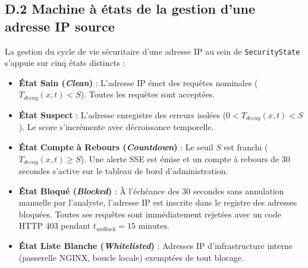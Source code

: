 \subsection*{D.2 Machine à états de la gestion d'une adresse IP source}
La gestion du cycle de vie sécuritaire d'une adresse IP au sein de \texttt{SecurityState} s'appuie sur cinq états distincts :
\begin{itemize}[leftmargin=*]
    \item \textbf{État Sain (\textit{Clean})} : L'adresse IP émet des requêtes nominales ($T_{decay}(x, t) < S$). Toutes les requêtes sont acceptées.
    \item \textbf{État Suspect} : L'adresse enregistre des erreurs isolées ($0 < T_{decay}(x, t) < S$). Le score s'incrémente avec décroissance temporelle.
    \item \textbf{État Compte à Rebours (\textit{Countdown})} : Le seuil $S$ est franchi ($T_{decay}(x, t) \ge S$). Une alerte SSE est émise et un compte à rebours de 30 secondes s'active sur le tableau de bord d'administration.
    \item \textbf{État Bloqué (\textit{Blocked})} : À l'échéance des 30 secondes sans annulation manuelle par l'analyste, l'adresse IP est inscrite dans le registre des adresses bloquées. Toutes ses requêtes sont immédiatement rejetées avec un code HTTP 403 pendant $t_{unblock} = 15\text{ minutes}$.
    \item \textbf{État Liste Blanche (\textit{Whitelisted})} : Adresses IP d'infrastructure interne (passerelle NGINX, boucle locale) exemptées de tout blocage.
\end{itemize}
